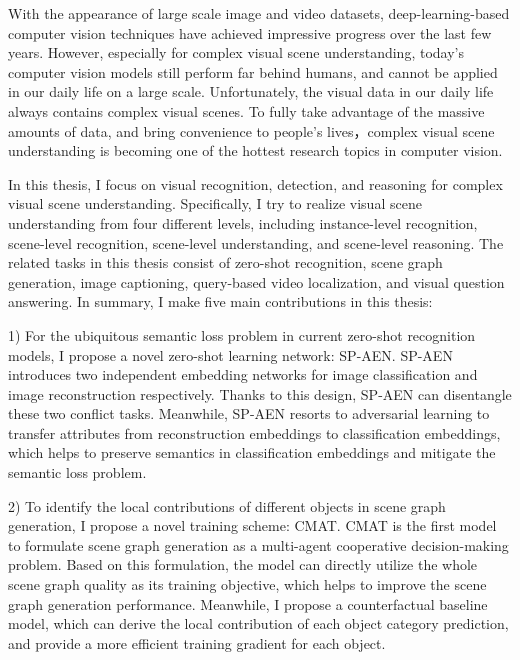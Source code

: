 \begin{englishabstract}

With the appearance of large scale image and video datasets, deep-learning-based computer vision techniques have achieved impressive progress over the last few years. However, especially for complex visual scene understanding, today's computer vision models still perform far behind humans, and cannot be applied in our daily life on a large scale. Unfortunately, the visual data in our daily life always contains complex visual scenes. To fully take advantage of the massive amounts of data, and bring convenience to people's lives，complex visual scene understanding is becoming one of the hottest research topics in computer vision.

In this thesis, I focus on visual recognition, detection, and reasoning for complex visual scene understanding. Specifically, I try to realize visual scene understanding from four different levels, including instance-level recognition, scene-level recognition, scene-level understanding, and scene-level reasoning. The related tasks in this thesis consist of zero-shot recognition, scene graph generation, image captioning, query-based video localization, and visual question answering. In summary, I make five main contributions in this thesis:

1) For the ubiquitous semantic loss problem in current zero-shot recognition models, I propose a novel zero-shot learning network: SP-AEN. SP-AEN introduces two independent embedding networks for image classification and image reconstruction respectively. Thanks to this design, SP-AEN can disentangle these two conflict tasks. Meanwhile, SP-AEN resorts to adversarial learning to transfer attributes from reconstruction embeddings to classification embeddings, which helps to preserve semantics in classification embeddings and mitigate the semantic loss problem.

2) To identify the local contributions of different objects in scene graph generation, I propose a novel training scheme: CMAT. CMAT is the first model to formulate scene graph generation as a multi-agent cooperative decision-making problem. Based on this formulation, the model can directly utilize the whole scene graph quality as its training objective, which helps to improve the scene graph generation performance. Meanwhile, I propose a counterfactual baseline model, which can derive the local contribution of each object category prediction, and provide a more efficient training gradient for each object.


\end{englishabstract}
